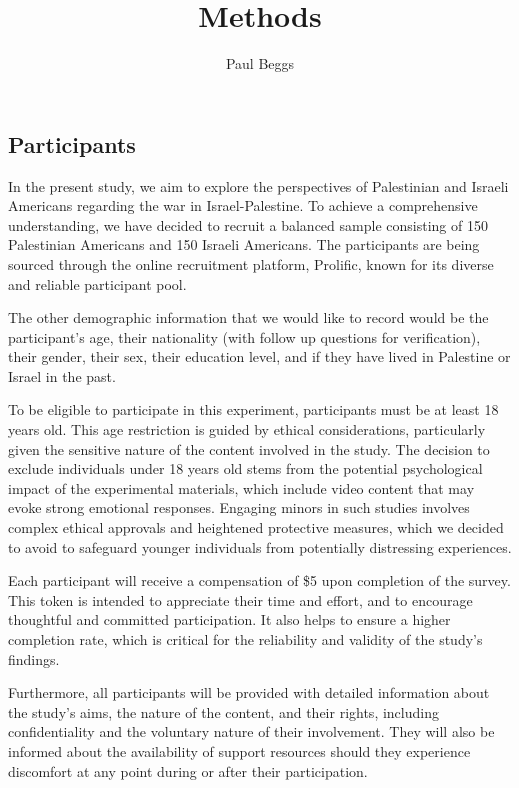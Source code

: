 \documentclass[stu,12pt,floatsintext]{apa7}
\title{Methods} %
\author{Paul Beggs}
\affiliation{Department of Psychology, Hendrix College}
\begin{document}
\maketitle %

\subsection{Participants}

In the present study, we aim to explore the perspectives of Palestinian and Israeli Americans regarding the war in Israel-Palestine. To achieve a comprehensive understanding, we have decided to recruit a balanced sample consisting of 150 Palestinian Americans and 150 Israeli Americans. The participants are being sourced through the online recruitment platform, Prolific, known for its diverse and reliable participant pool.

The other demographic information that we would like to record would be the participant's age, their nationality (with follow up questions for verification), their gender, their sex, their education level, and if they have lived in Palestine or Israel in the past. 

To be eligible to participate in this experiment, participants must be at least 18 years old. This age restriction is guided by ethical considerations, particularly given the sensitive nature of the content involved in the study. The decision to exclude individuals under 18 years old stems from the potential psychological impact of the experimental materials, which include video content that may evoke strong emotional responses. Engaging minors in such studies involves complex ethical approvals and heightened protective measures, which we decided to avoid to safeguard younger individuals from potentially distressing experiences.

Each participant will receive a compensation of \$5 upon completion of the survey. This token is intended to appreciate their time and effort, and to encourage thoughtful and committed participation. It also helps to ensure a higher completion rate, which is critical for the reliability and validity of the study's findings.

Furthermore, all participants will be provided with detailed information about the study’s aims, the nature of the content, and their rights, including confidentiality and the voluntary nature of their involvement. They will also be informed about the availability of support resources should they experience discomfort at any point during or after their participation.
\end{document}
